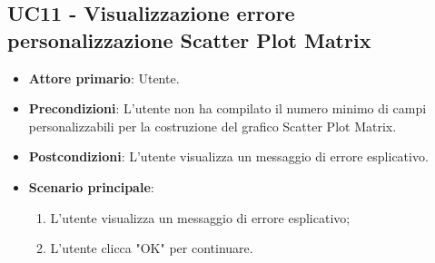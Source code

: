 \subsection{UC11 - Visualizzazione errore personalizzazione Scatter Plot Matrix}
\begin{itemize}
	\item \textbf{Attore primario}: Utente.
	\item \textbf{Precondizioni}: L'utente non ha compilato il numero minimo di campi personalizzabili per la costruzione del grafico Scatter Plot Matrix.
	\item \textbf{Postcondizioni}: L'utente visualizza un messaggio di errore esplicativo.
	\item \textbf{Scenario principale}:
		\begin{enumerate}
			\item L'utente visualizza un messaggio di errore esplicativo;
			\item L'utente clicca "OK" per continuare.
		\end{enumerate}
\end{itemize}